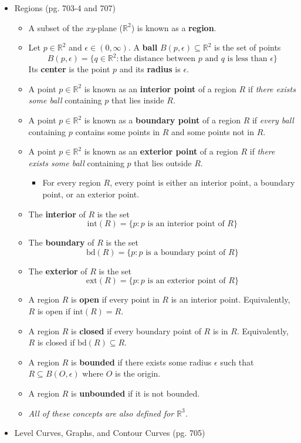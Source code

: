 \documentclass[12pt]{article}
\theoremstyle{plain}
\theoremstyle{definition}
\theoremstyle{remark}
\begin{document}
\begin{itemize}
	\newpage
		
	\item Regions (pg. 703-4 and 707)
	
		\begin{itemize}
		\item A subset of the $xy$-plane ($\mathbb{R}^2$) is known as a \textbf{region}.
		\item Let $p\in\mathbb{R}^2$ and $\epsilon \in (0,\infty)$. A \textbf{ball} $B(p,\epsilon) \subseteq \mathbb{R}^2$ is the set of points \[B(p,\epsilon) = \{q \in \mathbb{R}^2 : \text{the distance between }p\text{ and }q\text{ is less than }\epsilon\}\] Its \textbf{center} is the point $p$ and its \textbf{radius} is $\epsilon$.
		\item A point $p\in\mathbb{R}^2$ is known as an \textbf{interior point} of a region $R$ if \textit{there exists some ball} containing $p$ that lies inside $R$.
		\item A point $p\in\mathbb{R}^2$ is known as a \textbf{boundary point} of a region $R$ if \textit{every ball} containing $p$ contains some points in $R$ and some points not in $R$.
		\item A point $p\in\mathbb{R}^2$ is known as an \textbf{exterior point} of a region $R$ if \textit{there exists some ball} containing $p$ that lies outside $R$.
			\begin{itemize}
			\item For every region $R$, every point is either an interior point, a boundary point, or an exterior point.
			\end{itemize}
		\item The \textbf{interior} of $R$ is the set \[\textrm{int}(R)=\{p : p \text{ is an interior point of } R\}\]
		\item The \textbf{boundary} of $R$ is the set \[\textrm{bd}(R)=\{p : p \text{ is a boundary point of } R\}\]
		\item The \textbf{exterior} of $R$ is the set \[\textrm{ext}(R)=\{p : p \text{ is an exterior point of } R\}\]
		\item A region $R$ is \textbf{open} if every point in $R$ is an interior point. Equivalently, $R$ is open if $\textrm{int}(R) = R$.
		\item A region $R$ is \textbf{closed} if every boundary point of $R$ is in $R$. Equivalently, $R$ is closed if $\textrm{bd}(R) \subseteq R$.
		\item A region $R$ is \textbf{bounded} if there exists some radius $\epsilon$ such that $R \subseteq B(O,\epsilon)$ where $O$ is the origin.
		\item A region $R$ is \textbf{unbounded} if it is not bounded.
		\item \textit{All of these concepts are also defined for $\mathbb{R}^3$.}
		\end{itemize}
	\newpage
	\item Level Curves, Graphs, and Contour Curves (pg. 705)
	

\end{itemize}
\end{document}
